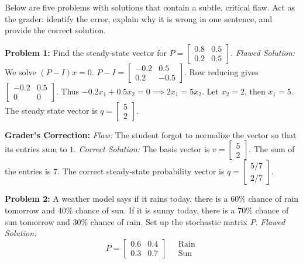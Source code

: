 \documentclass[11pt, letterpaper]{article}
\theoremstyle{definition}
\theoremstyle{remark}
\begin{document}
Below are five problems with solutions that contain a subtle, critical flaw. Act as the grader: identify the error, explain why it is wrong in one sentence, and provide the correct solution.

\vspace{1em}
\textbf{Problem 1:} Find the steady-state vector for $P = \begin{bmatrix} 0.8 & 0.5 \\ 0.2 & 0.5 \end{bmatrix}$.
\textit{Flawed Solution:} We solve $(P-I)x = 0$. $P-I = \begin{bmatrix} -0.2 & 0.5 \\ 0.2 & -0.5 \end{bmatrix}$. Row reducing gives $\begin{bmatrix} -0.2 & 0.5 \\ 0 & 0 \end{bmatrix}$. Thus $-0.2x_1 + 0.5x_2 = 0 \implies 2x_1 = 5x_2$. Let $x_2 = 2$, then $x_1 = 5$. The steady state vector is $q = \begin{bmatrix} 5 \\ 2 \end{bmatrix}$.

\textbf{Grader's Correction:}
\textit{Flaw:} The student forgot to normalize the vector so that its entries sum to $1$.
\textit{Correct Solution:} The basis vector is $v = \begin{bmatrix} 5 \\ 2 \end{bmatrix}$. The sum of the entries is $7$. The correct steady-state probability vector is $q = \begin{bmatrix} 5/7 \\ 2/7 \end{bmatrix}$.

\vspace{1em}
\textbf{Problem 2:} A weather model says if it rains today, there is a $60\%$ chance of rain tomorrow and $40\%$ chance of sun. If it is sunny today, there is a $70\%$ chance of sun tomorrow and $30\%$ chance of rain. Set up the stochastic matrix $P$.
\textit{Flawed Solution:} 
\[ P = \begin{bmatrix} 0.6 & 0.4 \\ 0.3 & 0.7 \end{bmatrix} \quad \begin{array}{l} \text{Rain} \\ \text{Sun} \end{array} \]
\end{document}
